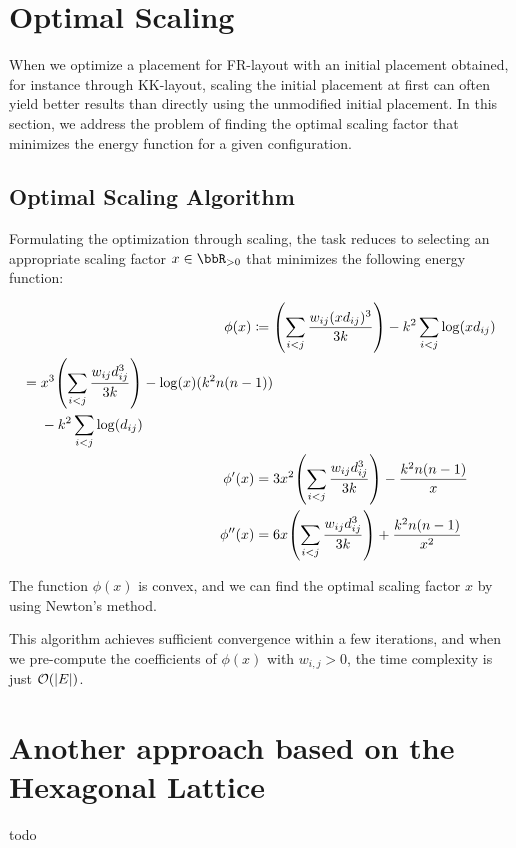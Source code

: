 \documentclass[dvipdfmx,journal]{IEEEtran}
\newcommand{\defeq}{\coloneqq}
\begin{document}
\appendices

\section{Optimal Scaling}

When we optimize a placement for FR-layout with an initial placement obtained, for instance through KK-layout, scaling the initial placement at first can often yield better results than directly using the unmodified initial placement.
In this section, we address the problem of finding the optimal scaling factor that minimizes the energy function for a given configuration.

\subsection{Optimal Scaling Algorithm}

Formulating the optimization through scaling, the task reduces to selecting an appropriate scaling factor $x \in \bbR_{> 0}$ that minimizes the following energy function:

\begin{align*}
  \phi(x) \defeq {} & \qty(\sum_{i < j} \frac{w_{ij} (xd_{ij})^3}{3k}) - k^2 \sum_{i < j} \log(x d_{ij})                                  \\
  \begin{split}
    = {} & x^3 \qty(\sum_{i < j} \frac{w_{ij} d_{ij}^3}{3k}) - \log(x)(k^2 n(n-1))\\
    & - k^2 \sum_{i < j} \log(d_{ij})
  \end{split} \\
  \phi'(x) = {}     & 3x^2 \qty(\sum_{i < j} \frac{w_{ij} d_{ij}^3}{3k}) - \frac{k^2 n(n-1)}{x}                                           \\
  \phi''(x) = {}    & 6x \qty(\sum_{i < j} \frac{w_{ij} d_{ij}^3}{3k}) + \frac{k^2 n(n-1)}{x^2}
\end{align*}

The function $\phi(x)$ is convex, and we can find the optimal scaling factor $x$ by using Newton's method.

This algorithm achieves sufficient convergence within a few iterations, and when we pre-compute the coefficients of $\phi(x)$ with $w_{i,j} > 0$, the time complexity is just $\order{\abs{E}}$.

\section{Another approach based on the Hexagonal Lattice}

todo
\end{document}
